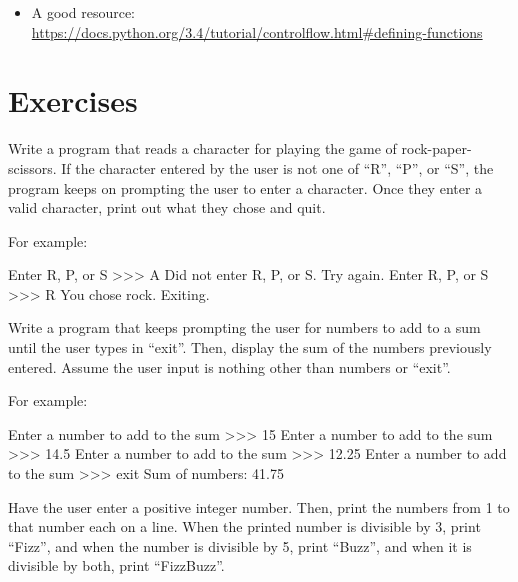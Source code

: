 \documentclass[11pt]{cselabheader}
\begin{document}
{\begin{itemize}
  \item A good resource: \\
  \url{https://docs.python.org/3.4/tutorial/controlflow.html#defining-functions}
\end{itemize}

\pagebreak
\section{Exercises}
\label{subsec:whileex}

\begin{ex}[rps.py] Write a program that reads a character for playing the game of
    rock-paper-scissors. If the character entered by the user is not one of
    ``R'', ``P'', or ``S'', the program keeps on prompting the user to enter a
    character. Once they enter a valid character, print out what they chose
    and quit.


    For example:

\begin{verbatimcode}
Enter R, P, or S >>> A
Did not enter R, P, or S. Try again.
Enter R, P, or S >>> R
You chose rock. Exiting.
\end{verbatimcode}
\end{ex}

\begin{ex}[sums.py] Write a program that keeps prompting the user for numbers to
  add to a sum until the user types in ``exit''. Then, display the sum of the
  numbers previously entered. Assume the user input is nothing other than
  numbers or ``exit''.

  For example:

  \begin{verbatimcode}
Enter a number to add to the sum >>> 15
Enter a number to add to the sum >>> 14.5
Enter a number to add to the sum >>> 12.25
Enter a number to add to the sum >>> exit
Sum of numbers: 41.75
  \end{verbatimcode}
\end{ex}

\begin{ex}[fizzbuzz.py] Have the user enter a positive integer number. Then,
  print the numbers from 1 to that number each on a line. When the printed
  number is divisible by 3, print ``Fizz'', and when the number is divisible by
  5, print ``Buzz'', and when it is divisible by both, print ``FizzBuzz''.


\end{ex}}
\end{document}
